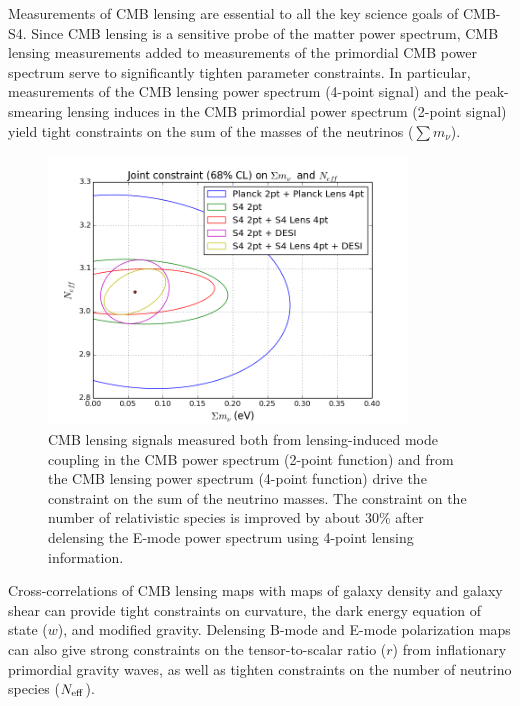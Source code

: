 \documentclass{tcibook}
\begin{document}
Measurements of CMB lensing are essential to all the key science goals of CMB-S4.  Since CMB lensing is a sensitive probe of the matter power spectrum, CMB lensing measurements added to measurements of the primordial CMB power spectrum serve to significantly tighten parameter constraints.  In particular, measurements of the CMB lensing power spectrum (4-point signal) and the peak-smearing lensing induces in the CMB primordial power spectrum (2-point signal) yield tight constraints on the sum of the masses of the neutrinos ($\sum {m_\nu}$).  
\begin{figure}[h]
\centering
\includegraphics[width=0.85\textwidth]{Neff_Mnu.png}
\caption{CMB lensing signals measured both from lensing-induced mode coupling in the CMB power spectrum (2-point function) and from the CMB lensing power spectrum (4-point function) drive the constraint on the sum of the neutrino masses.  The constraint on the number of relativistic species is improved by about 30\% after delensing the E-mode power spectrum using 4-point lensing information.}
\label{neutrinos}
\end{figure}
Cross-correlations of CMB lensing maps with maps of galaxy density and galaxy shear can provide tight constraints on curvature, the dark energy equation of state ($w$), and modified gravity.  Delensing B-mode and E-mode polarization maps can also give strong constraints on the tensor-to-scalar ratio ($r$) from inflationary primordial gravity waves, as well as tighten constraints on the number of neutrino species ($N_{\rm{eff}}$).  
\end{document}

